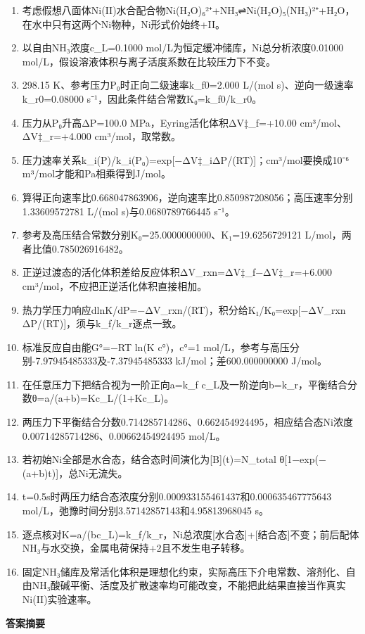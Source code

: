 \documentclass[UTF8,11pt,a4paper]{ctexart}
\begin{document}
\begin{enumerate}
\item 考虑假想八面体Ni(II)水合配合物Ni(H₂O)₆²⁺+NH₃⇌Ni(H₂O)₅(NH₃)²⁺+H₂O，在水中只有这两个Ni物种，Ni形式价始终+II。
\item 以自由NH₃浓度c\_L=0.1000 mol/L为恒定缓冲储库，Ni总分析浓度0.01000 mol/L，假设溶液体积与离子活度系数在比较压力下不变。
\item 298.15 K、参考压力P₀时正向二级速率k\_f0=2.000 L/(mol s)、逆向一级速率k\_r0=0.08000 s⁻¹，因此条件结合常数K₀=k\_f0/k\_r0。
\item 压力从P₀升高ΔP=100.0 MPa，Eyring活化体积ΔV‡\_f=+10.00 cm³/mol、ΔV‡\_r=+4.000 cm³/mol，取常数。
\item 压力速率关系k\_i(P)/k\_i(P₀)=exp[−ΔV‡\_iΔP/(RT)]；cm³/mol要换成10⁻⁶ m³/mol才能和Pa相乘得到J/mol。
\item 算得正向速率比0.668047863906，逆向速率比0.850987208056；高压速率分别1.33609572781 L/(mol s)与0.0680789766445 s⁻¹。
\item 参考及高压结合常数分别K₀=25.0000000000、K₁=19.6256729121 L/mol，两者比值0.785026916482。
\item 正逆过渡态的活化体积差给反应体积ΔV\_rxn=ΔV‡\_f−ΔV‡\_r=+6.000 cm³/mol，不应把正逆活化体积直接相加。
\item 热力学压力响应dlnK/dP=−ΔV\_rxn/(RT)，积分给K₁/K₀=exp[−ΔV\_rxn ΔP/(RT)]，须与k\_f/k\_r逐点一致。
\item 标准反应自由能G°=−RT ln(K c°)，c°=1 mol/L，参考与高压分别-7.97945485333及-7.37945485333 kJ/mol；差600.000000000 J/mol。
\item 在任意压力下把结合视为一阶正向a=k\_f c\_L及一阶逆向b=k\_r，平衡结合分数θ=a/(a+b)=Kc\_L/(1+Kc\_L)。
\item 两压力下平衡结合分数0.714285714286、0.662454924495，相应结合态Ni浓度0.00714285714286、0.00662454924495 mol/L。
\item 若初始Ni全部是水合态，结合态时间演化为[B](t)=N\_total θ[1−exp(−(a+b)t)]，总Ni无流失。
\item t=0.5s时两压力结合态浓度分别0.000933155461437和0.000635467775643 mol/L，弛豫时间分别3.57142857143和4.95813968045 s。
\item 逐点核对K=a/(bc\_L)=k\_f/k\_r，Ni总浓度[水合态]+[结合态]不变；前后配体NH₃与水交换，金属电荷保持+2且不发生电子转移。
\item 固定NH₃储库及常活化体积是理想化约束，实际高压下介电常数、溶剂化、自由NH₃酸碱平衡、活度及扩散速率均可能改变，不能把此结果直接当作真实Ni(II)实验速率。
\end{enumerate}
\noindent\textbf{答案摘要}\par
\end{document}
